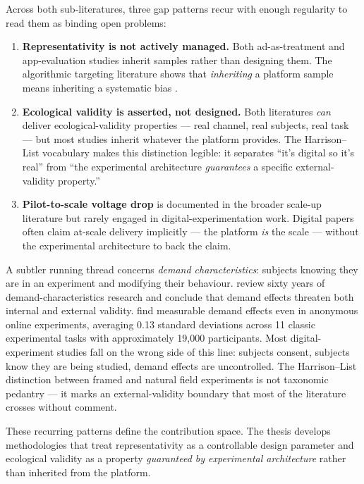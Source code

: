 Across both sub-literatures, three gap patterns recur with enough regularity to read them as binding open problems:

\begin{enumerate}[leftmargin=*]
    \item \textbf{Representativity is not actively managed.} Both ad-as-treatment and app-evaluation studies inherit samples rather than designing them. The algorithmic targeting literature shows that \emph{inheriting} a platform sample means inheriting a systematic bias \citep{Ali2019,Boegershausen2025}.
    \item \textbf{Ecological validity is asserted, not designed.} Both literatures \emph{can} deliver ecological-validity properties --- real channel, real subjects, real task --- but most studies inherit whatever the platform provides. The Harrison--List vocabulary makes this distinction legible: it separates ``it's digital so it's real'' from ``the experimental architecture \emph{guarantees} a specific external-validity property.''
    \item \textbf{Pilot-to-scale voltage drop} is documented in the broader scale-up literature \citep{Muralidharan2017,Bold2018,Al-Ubaydli2020} but rarely engaged in digital-experimentation work. Digital papers often claim at-scale delivery implicitly --- the platform \emph{is} the scale --- without the experimental architecture to back the claim.
\end{enumerate}

A subtler running thread concerns \emph{demand characteristics}: subjects knowing they are in an experiment and modifying their behaviour. \citet{Corneille2023} review sixty years of demand-characteristics research and conclude that demand effects threaten both internal and external validity. \citet{deQuidt2018} find measurable demand effects even in anonymous online experiments, averaging 0.13 standard deviations across 11 classic experimental tasks with approximately 19,000 participants. Most digital-experiment studies fall on the wrong side of this line: subjects consent, subjects know they are being studied, demand effects are uncontrolled. The Harrison--List distinction between framed and natural field experiments is not taxonomic pedantry --- it marks an external-validity boundary that most of the literature crosses without comment.

These recurring patterns define the contribution space. The thesis develops methodologies that treat representativity as a controllable design parameter and ecological validity as a property \emph{guaranteed by experimental architecture} rather than inherited from the platform.

